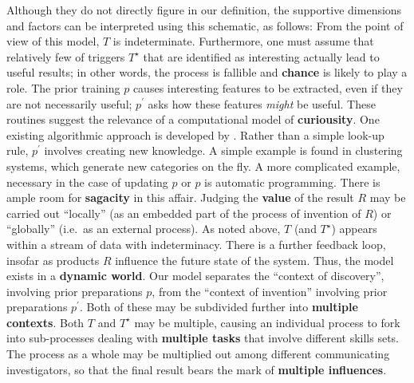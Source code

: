 Although they do not directly figure in our definition, the supportive
dimensions and factors can be interpreted using this schematic, as
follows:
%
From the point of view of this model, $T$ is indeterminate.
Furthermore, one must assume that relatively few of triggers $T^\star$
that are identified as interesting actually lead to useful results; in
other words, the process is fallible and \textbf{chance} is likely to
play a role.
%
The prior training $p$ causes interesting features
to be extracted, even if they are not necessarily useful; $p^{\prime}$
asks how these features \emph{might} be useful.  These routines 
suggest the relevance of a computational model of \textbf{curiousity}.  One existing algorithmic approach is developed by .
%
Rather than a simple look-up rule, $p^{\prime}$ involves creating new knowledge.  A simple example is found in clustering systems, which generate new categories on the fly.  A more complicated example, necessary in the case of updating $p$ or $p$ is automatic programming.  There is ample room for \textbf{sagacity} in this affair.
%
Judging the \textbf{value} of the result $R$ may be carried out
``locally'' (as an embedded part of the process of invention of $R$)
or ``globally'' (i.e.~as an external process).
%
As noted above, $T$ (and $T^\star$) appears within a stream of data
with indeterminacy.  There is a further feedback loop, insofar as
products $R$ influence the future state of the system.  Thus, the
model exists in a \textbf{dynamic world}.
%
Our model separates the
``context of discovery'', involving prior preparations $p$, from the
``context of invention'' involving prior preparations $p^{\prime}$.
Both of these may be subdivided further into \textbf{multiple contexts}. 
%
Both $T$ and $T^\star$ may be multiple, causing an individual process
to fork into sub-processes dealing with \textbf{multiple tasks} that
involve different skills sets.
%
The process as a whole may be multiplied out among different
communicating investigators, so that the final result bears the mark
of \textbf{multiple influences}.




